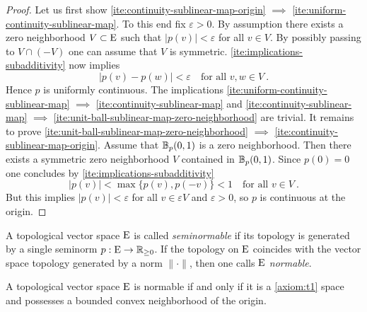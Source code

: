 \begin{proof}
  Let us first show \ref{ite:continuity-sublinear-map-origin}  $\implies$ \ref{ite:uniform-continuity-sublinear-map}.
  To this end fix $\varepsilon >0$. By assumption there exists a zero neighborhood $V\subset \mathrm{E}$ such that
  $|p(v)| < \varepsilon$ for all $v\in V$. By possibly passing to $V \cap (-V)$ one can assume that
  $V$ is symmetric. 
   \ref{ite:implications-subadditivity}
  now implies
  \[
     | p(v) - p(w)| <  \varepsilon \quad \text{for all } v,w \in V \ .
  \]
  Hence $p$ is uniformly continuous.   
  The implications \ref{ite:uniform-continuity-sublinear-map} $\implies$ \ref{ite:continuity-sublinear-map}
  and \ref{ite:continuity-sublinear-map} $\implies$ \ref{ite:unit-ball-sublinear-map-zero-neighborhood} are trivial.
  It remains to prove
  \ref{ite:unit-ball-sublinear-map-zero-neighborhood} $\implies$ \ref{ite:continuity-sublinear-map-origin}.
  Assume that  $\mathbb{B}_p (0,1)$ is a zero neighborhood.
  Then there exists a symmetric zero neighborhood $V$ contained in  $\mathbb{B}_p (0,1)$.  Since $p(0)=0$ one concludes by
   \ref{ite:implications-subadditivity}
  \[
     | p(v) | <  \max \{ p(v), p(-v )\} < 1   \quad \text{for all } v \in V \ .
  \]
  But this implies $|p(v)| < \varepsilon $ for all $v \in \varepsilon V$ and $\varepsilon >0$,
  so $p$ is continuous at the origin. 
\end{proof}


\begin{definition}
  A topological vector space $\mathrm{E}$ is called \emph{seminormable} if its topology is generated by a single
  seminorm $p:\mathrm{E}\to \mathbb{R}_{\geq 0}$.
  If the topology on  $\mathrm{E}$ coincides with the vector space topology generated by a norm $\|\cdot\|$,
  then one calls $\mathrm{E}$ \emph{normable}.
\end{definition}

\begin{theorem}
  A topological vector space $\mathrm{E}$ is normable if and only if it is a \ref{axiom:t1} space and 
  possesses a bounded convex neighborhood of the origin.  
\end{theorem}
